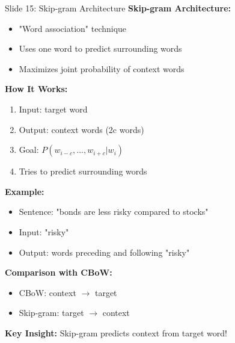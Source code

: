 \documentclass[8pt]{beamer}
\begin{document}
	\begin{frame}{Slide 15: Skip-gram Architecture}
		\fontsize{6.5}{7.5}\selectfont
		\textbf{Skip-gram Architecture:}
		\begin{itemize}
			\item "Word association" technique
			\item Uses one word to predict surrounding words
			\item Maximizes joint probability of context words
		\end{itemize}
		
		\vspace{0.1cm}
		\textbf{How It Works:}
		\begin{enumerate}
			\item Input: target word
			\item Output: context words (2c words)
			\item Goal: $P(w_{i-c}, ..., w_{i+c} | w_i)$
			\item Tries to predict surrounding words
		\end{enumerate}
		
		\vspace{0.1cm}
		\textbf{Example:}
		\begin{itemize}
			\item Sentence: "bonds are less risky compared to stocks"
			\item Input: "risky"
			\item Output: words preceding and following "risky"
		\end{itemize}
		
		\vspace{0.1cm}
		\textbf{Comparison with CBoW:}
		\begin{itemize}
			\item CBoW: context $\to$ target
			\item Skip-gram: target $\to$ context
		\end{itemize}
		
		\textcolor{myblue}{\textbf{Key Insight:}} Skip-gram predicts context from target word!
	\end{frame}
	
\end{document}
